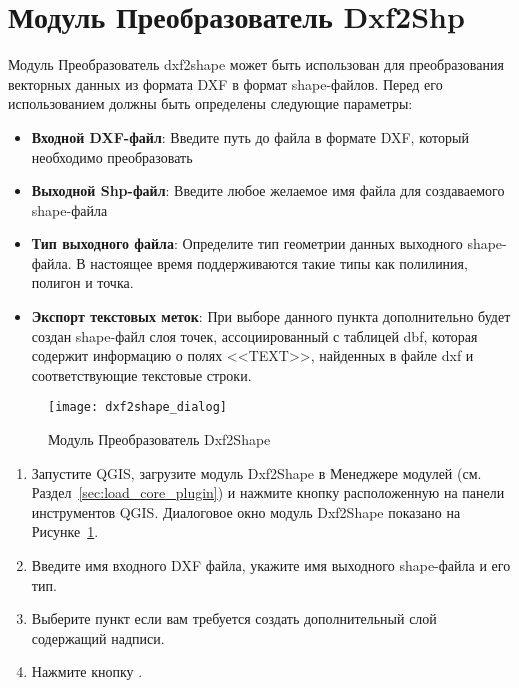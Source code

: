 
\section{Модуль Преобразователь Dxf2Shp}


Модуль Преобразователь dxf2shape может быть использован для преобразования
векторных данных из формата DXF в формат shape-файлов. Перед его
использованием должны быть определены следующие параметры:

\begin{itemize}
\item \textbf{Входной DXF-файл}: Введите путь до файла в формате DXF,
который необходимо преобразовать
\item \textbf{Выходной Shp-файл}: Введите любое желаемое имя файла для
создаваемого shape-файла
\item \textbf{Тип выходного файла}: Определите тип геометрии данных
выходного shape-файла. В настоящее время поддерживаются такие типы как
полилиния, полигон и точка.
\item \textbf{Экспорт текстовых меток}: При выборе данного пункта
дополнительно будет создан shape-файл слоя точек, ассоциированный с
таблицей dbf, которая содержит информацию о полях <<TEXT>>, найденных в
файле dxf и соответствующие текстовые строки.
\end{itemize}

\begin{figure}[ht]
   \centering
   \texttt{[image: dxf2shape\_dialog]}
   \caption{Модуль Преобразователь Dxf2Shape \wincaption}\label{fig:dxf2shape_dialog}
\end{figure}


\begin{enumerate}
  \item Запустите QGIS, загрузите модуль Dxf2Shape в Менеджере модулей
  (см. Раздел~\ref{sec:load_core_plugin}) и нажмите кнопку
   расположенную на
  панели инструментов QGIS. Диалоговое окно модуль Dxf2Shape показано на
  Рисунке~\ref{fig:dxf2shape_dialog}.
  \item Введите имя входного DXF файла, укажите имя выходного shape-файла
  и его тип.
  \item Выберите пункт  если вам
  требуется создать дополнительный слой содержащий надписи.
  \item Нажмите кнопку .
\end{enumerate}

\FloatBarrier
